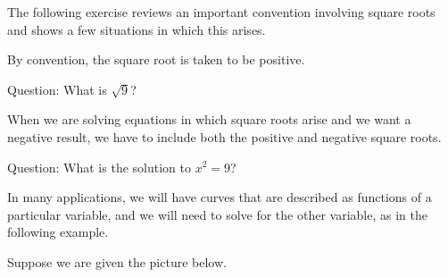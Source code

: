 \documentclass{ximera}
\author{Jim Talamo}
\begin{document}
\begin{exercise}

The following exercise reviews an important convention involving square roots and shows a few situations in which this arises.
 
\begin{fact}
By convention, the square root is taken to be positive.
\end{fact}
 
Question: What is $\sqrt{9}$?
 \begin{multipleChoice}
 \end{multipleChoice}
 
When we are solving equations in which square roots arise and we want a negative result, we have to include both the positive and negative square roots.
 
Question: What is the solution to $x^2=9$?
  \begin{multipleChoice}
 \end{multipleChoice}
 
\begin{exercise}
In many applications, we will have curves that are described as functions of a particular variable, and we will need to solve for the other variable, as in the following example.

Suppose we are given the picture below.


 \begin{image}
\end{image}
\end{exercise}
\end{exercise}
\end{document}
